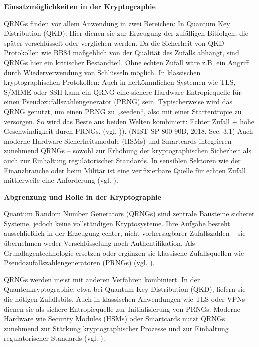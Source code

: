 \vspace{1em}
\textbf{Einsatzmöglichkeiten in der Kryptographie}


QRNGs finden vor allem Anwendung in zwei Bereichen:
\smallskip
In Quantum Key Distribution (QKD): Hier dienen sie zur Erzeugung der zufälligen Bitfolgen, die später verschlüsselt oder verglichen werden. Da die Sicherheit von QKD-Protokollen wie BB84 maßgeblich von der Qualität des Zufalls abhängt, sind QRNGs hier ein kritischer Bestandteil. Ohne echten Zufall wäre z.B. ein Angriff durch Wiederverwendung von Schlüsseln möglich.
\smallskip
In klassischen kryptographischen Protokollen: Auch in herkömmlichen Systemen wie TLS, S/MIME oder SSH kann ein QRNG eine sichere Hardware-Entropiequelle für einen Pseudozufallszahlengenerator (PRNG) sein. Typischerweise wird das QRNG genutzt, um einen PRNG zu „seeden“, also mit einer Startentropie zu versorgen. So wird das Beste aus beiden Welten kombiniert: Echter Zufall + hohe Geschwindigkeit durch PRNGs. (vgl. )\cite{nist_fips_2024}).
\smallskip
(NIST SP 800-90B, 2018, Sec. 3.1)
Auch moderne Hardware-Sicherheitsmodule (HSMs) und Smartcards integrieren zunehmend QRNGs – sowohl zur Erhöhung der kryptographischen Sicherheit als auch zur Einhaltung regulatorischer Standards. In sensiblen Sektoren wie der Finanzbranche oder beim Militär ist eine verifizierbare Quelle für echten Zufall mittlerweile eine Anforderung (vgl. \cite{sanguinetti_b_et_al_quantum_2014}).


\vspace{1em}
\textbf{Abgrenzung und Rolle in der Kryptographie}


Quantum Random Number Generators (QRNGs) sind zentrale Bausteine sicherer Systeme, jedoch keine vollständigen Kryptosysteme. Ihre Aufgabe besteht ausschließlich in der Erzeugung echter, nicht vorhersagbarer Zufallszahlen – sie übernehmen weder Verschlüsselung noch Authentifikation. Als Grundlagentechnologie ersetzen oder ergänzen sie klassische Zufallsquellen wie Pseudozufallszahlengeneratoren (PRNGs) (vgl. \cite{herrero-collantes_et_al_quantum_2017}).


QRNGs werden meist mit anderen Verfahren kombiniert. In der Quantenkryptographie, etwa bei Quantum Key Distribution (QKD), liefern sie die nötigen Zufallsbits. Auch in klassischen Anwendungen wie TLS oder VPNs dienen sie als sichere Entropiequelle zur Initialisierung von PRNGs. Moderne Hardware wie Security Modules (HSMs) oder Smartcards nutzt QRNGs zunehmend zur Stärkung kryptographischer Prozesse und zur Einhaltung regulatorischer Standards (vgl. \cite{ma_x_et_al_quantum_2016, sanguinetti_b_et_al_quantum_2014}).


